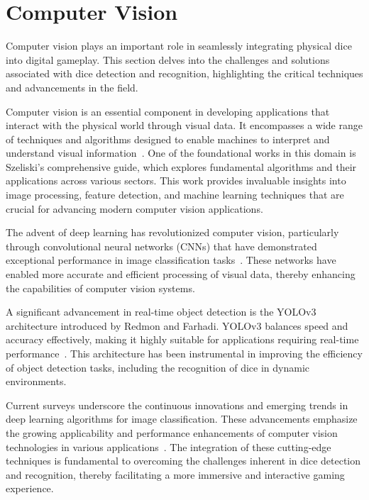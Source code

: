 \section{Computer Vision}

Computer vision plays an important role in seamlessly integrating physical dice into digital gameplay. This section delves into the challenges and solutions associated with dice detection and recognition, highlighting the critical techniques and advancements in the field.

Computer vision is an essential component in developing applications that interact with the physical world through visual data. It encompasses a wide range of techniques and algorithms designed to enable machines to interpret and understand visual information~\cite{szeliski2010computer}. One of the foundational works in this domain is Szeliski's comprehensive guide, which explores fundamental algorithms and their applications across various sectors. This work provides invaluable insights into image processing, feature detection, and machine learning techniques that are crucial for advancing modern computer vision applications.

The advent of deep learning has revolutionized computer vision, particularly through convolutional neural networks (CNNs) that have demonstrated exceptional performance in image classification tasks~\cite{krizhevsky2012imagenet}. These networks have enabled more accurate and efficient processing of visual data, thereby enhancing the capabilities of computer vision systems.

A significant advancement in real-time object detection is the YOLOv3 architecture introduced by Redmon and Farhadi. YOLOv3 balances speed and accuracy effectively, making it highly suitable for applications requiring real-time performance~\cite{redmon2018yolov3}. This architecture has been instrumental in improving the efficiency of object detection tasks, including the recognition of dice in dynamic environments.

Current surveys underscore the continuous innovations and emerging trends in deep learning algorithms for image classification. These advancements emphasize the growing applicability and performance enhancements of computer vision technologies in various applications~\cite{khan2020survey}. The integration of these cutting-edge techniques is fundamental to overcoming the challenges inherent in dice detection and recognition, thereby facilitating a more immersive and interactive gaming experience.

